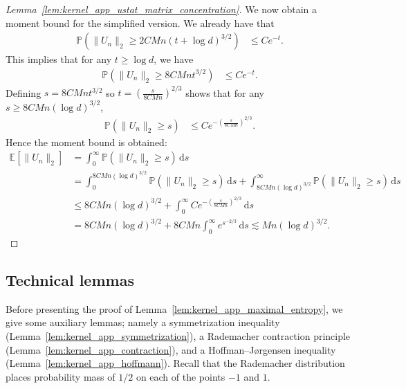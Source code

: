 \documentclass[11pt,lof]{puthesis}
\renewcommand{\P}{\ensuremath{\mathbb{P}}}
\newcommand{\E}{\ensuremath{\mathbb{E}}}
\newcommand{\diff}[1]{\,\mathrm{d}#1}
\theoremstyle{break}
\theoremstyle{proof}
\newtheorem{proof}{Proof}
\begin{document}
\begin{proof}[Lemma~\ref{lem:kernel_app_ustat_matrix_concentration}]
  We now obtain a moment bound for the simplified version.
  We already have that
  \begin{align*}
    \P\left(
      \|U_n\|_2
      \geq
      2 C M n
      (t + \log d)^{3/2}
    \right)
    &\leq
    C e^{-t}.
  \end{align*}
  This implies that for any $t \geq \log d$,
  we have
  \begin{align*}
    \P\left(
      \|U_n\|_2
      \geq
      8 C M n
      t^{3/2}
    \right)
    &\leq
    C e^{-t}.
  \end{align*}
  Defining
  $s = 8 C M n t^{3/2}$
  so $t = \left( \frac{s}{8C M n} \right)^{2/3}$
  shows that for any $s \geq 8C M n(\log d)^{3/2}$,
  \begin{align*}
    \P\left(
      \|U_n\|_2
      \geq
      s
    \right)
    &\leq
    C e^{-\left( \frac{s}{8C M n} \right)^{2/3}}.
  \end{align*}
  Hence the moment bound is obtained:
  \begin{align*}
    \E\left[
      \|U_n\|_2
    \right]
    &=
    \int_0^\infty
    \P\left(
      \|U_n\|_2
      \geq
      s
    \right)
    \diff{s} \\
    &=
    \int_0^{8C M n(\log d)^{3/2}}
    \P\left(
      \|U_n\|_2
      \geq
      s
    \right)
    \diff{s}
    +
    \int_{8C M n(\log d)^{3/2}}^\infty
    \P\left(
      \|U_n\|_2
      \geq
      s
    \right)
    \diff{s} \\
    &\leq
    8C M n(\log d)^{3/2}
    +
    \int_0^\infty
    C e^{-\left( \frac{s}{8C M n} \right)^{2/3}}
    \diff{s} \\
    &=
    8C M n(\log d)^{3/2}
    +
    8C M n
    \int_0^\infty
    e^{s^{-2/3}}
    \diff{s}
    \lesssim
    Mn(\log d)^{3/2}.
  \end{align*}
\end{proof}

\subsection{Technical lemmas}

Before presenting the proof of
Lemma~\ref{lem:kernel_app_maximal_entropy},
we give some auxiliary lemmas;
namely a symmetrization inequality
(Lemma~\ref{lem:kernel_app_symmetrization}),
a Rademacher contraction principle
(Lemma~\ref{lem:kernel_app_contraction}),
and a Hoffman--J{\o}rgensen inequality
(Lemma~\ref{lem:kernel_app_hoffmann}).
Recall that the Rademacher distribution
places probability mass of $1/2$
on each of the points $-1$ and $1$.
\end{document}
